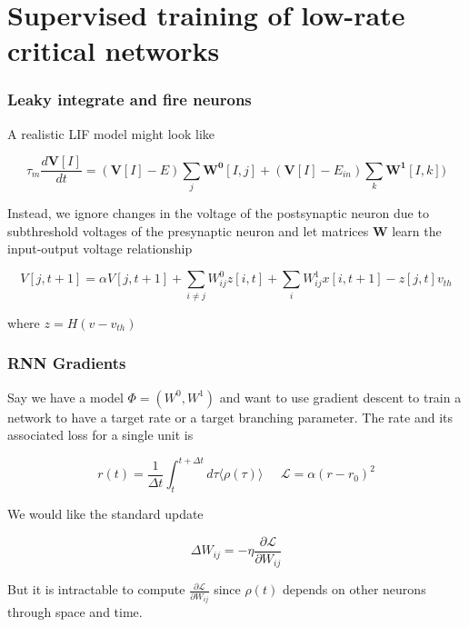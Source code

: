 \documentclass{beamer}
\begin{document}
\section{Supervised training of low-rate critical networks} 

\begin{frame}[plain]
\frametitle{Leaky integrate and fire neurons} 

A realistic LIF model might look like

\begin{equation*}
\tau_{m}\frac{d\mathbf{V}[I]}{dt} = (\mathbf{V}[I]-E)\sum_{j} \mathbf{W^{0}}[I,j] + (\mathbf{V}[I] - E_{in})\sum_{k}\mathbf{W^{1}}[I,k])
\end{equation*}

Instead, we ignore changes in the voltage of the postsynaptic neuron due to subthreshold voltages of the presynaptic neuron and let matrices $\mathbf{W}$ learn the input-output voltage relationship

\begin{equation*}
V[j,t+1] = \alpha V[j,t+1] + \sum_{i\neq j} W^{0}_{ij}z[i,t] + \sum_{i} W^{1}_{ij}x[i,t+1] - z[j,t]v_{th} 
\end{equation*}

where $z = H(v-v_{th})$


\end{frame}


\begin{frame}[plain]
\frametitle{RNN Gradients} 

Say we have a model $\Phi = (W^{0},W^{1})$ and want to use gradient descent to train a network to have a target rate or a target branching parameter. The rate and its associated loss for a single unit is

\begin{equation*}
r(t) = \frac{1}{\Delta t}\int_{t}^{t+\Delta t} d\tau \langle \rho(\tau)\rangle\;\;\;\;\;\mathcal{L} = \alpha(r-r_{0})^{2}
\end{equation*}

We would like the standard update 

\begin{equation*}
\Delta W_{ij} = -\eta \frac{\partial\mathcal{L}}{\partial W_{ij}}
\end{equation*}


But it is intractable to compute $\frac{\partial\mathcal{L}}{\partial W_{ij}}$ since $\rho(t)$ depends on other neurons through space and time.


\end{frame}
\end{document}

